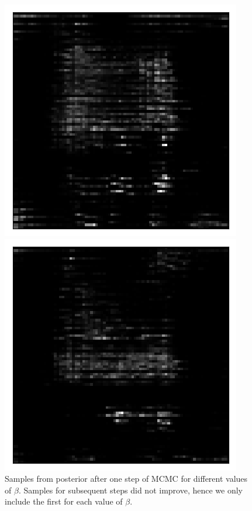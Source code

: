 \begin{figure}[h!]
\begin{multicols}{4}
    \includegraphics[scale=0.4]{figures/results/naive_average/beta_2_posterior_sample_0.png}
    \caption{$\beta=2$}
    \includegraphics[scale=0.4]{figures/results/naive_average/beta_4_posterior_sample_0.png}
    \caption{$\beta=4$}
\end{multicols}
\caption{Samples from posterior after one step of MCMC for different values of $\beta$. Samples for subsequent steps did not improve, hence we only include the first for each value of $\beta$.}
\label{fig:naive_average_originals_posterior_samples}
\end{figure}



